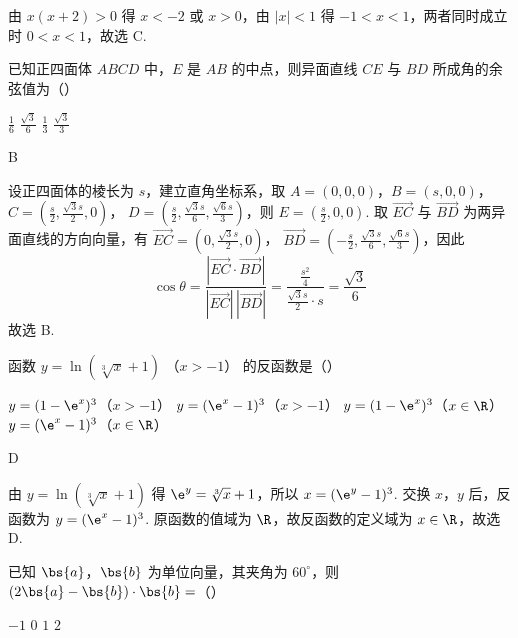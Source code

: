 \begin{solution}
由 \(x(x+2)>0\) 得 \(x<-2\) 或 \(x>0\)，由 \(|x|<1\) 得 \(-1<x<1\)，两者同时成立时 \(0<x<1\)，故选 C.
\end{solution}

\begin{problem}
已知正四面体 \(ABCD\) 中，\(E\) 是 \(AB\) 的中点，则异面直线 \(CE\) 与 \(BD\) 所成角的余弦值为（\quad）

\choices
    {\(\frac{1}{6}\)}
    {\(\frac{\sqrt{3}}{6}\)}
    {\(\frac{1}{3}\)}
    {\(\frac{\sqrt{3}}{3}\)}
\end{problem}

\begin{answer}
B
\end{answer}

\begin{solution}
设正四面体的棱长为 \(s\)，建立直角坐标系，取
\(A=(0,0,0)\)，\(B=(s,0,0)\)，\(C=(\frac{s}{2},\frac{\sqrt{3}s}{2},0)\)，
\(D=(\frac{s}{2},\frac{\sqrt{3}s}{6},\frac{\sqrt{6}s}{3})\)，则
\(E=(\frac{s}{2},0,0)\). 取
\(\overrightarrow{EC}\) 与 \(\overrightarrow{BD}\) 为两异面直线的方向向量，有
\(\overrightarrow{EC}=(0,\frac{\sqrt{3}s}{2},0)\)，
\(\overrightarrow{BD}=(-\frac{s}{2},\frac{\sqrt{3}s}{6},\frac{\sqrt{6}s}{3})\)，因此
\[
\cos\theta=\frac{|\overrightarrow{EC}\cdot\overrightarrow{BD}|}{|\overrightarrow{EC}|\,|\overrightarrow{BD}|}
=\frac{\frac{s^{2}}{4}}{\frac{\sqrt{3}s}{2}\cdot s}=\frac{\sqrt{3}}{6}
\]
故选 B.
\end{solution}

\begin{problem}
函数 \( y = \ln (\sqrt[3]{x} + 1) \) （\( x > -1 \)） 的反函数是（\quad）

\choices
    {\( y = (1 - \e^{x})^{3}  \)（\(x > -1\)）}
    {\( y = (\e^{x} - 1)^{3}  \)（\(x > -1\)）}
    {\( y = (1 - \e^{x})^{3}  \)（\(x \in \R\)）}
    {\( y = (\e^{x} - 1)^{3}  \)（\(x \in \R\)）}
\end{problem}

\begin{answer}
D
\end{answer}

\begin{solution}
由 \(y=\ln(\sqrt[3]{x}+1)\) 得 \(\e^y=\sqrt[3]{x}+1\)，所以
\(x=(\e^y-1)^3\). 交换 \(x\)，\(y\) 后，反函数为
\(y=(\e^x-1)^3\). 原函数的值域为 \(\R\)，故反函数的定义域为
\(x\in\R\)，故选 D.
\end{solution}

\begin{problem}
已知 \(\bs{a}\)，\(\bs{b}\) 为单位向量，其夹角为 \(60^{\circ}\)，则 \((2\bs{a} - \bs{b}) \cdot \bs{b} =\)（\quad）

\choices
    {\(-1\)}
    {\(0\)}
    {\(1\)}
    {\(2\)}
\end{problem}

